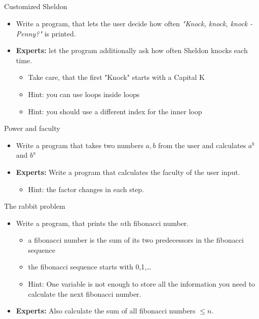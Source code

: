 \subsection{}
\begin{frame}{Customized Sheldon}
	\begin{itemize}
		\item Write a program, that lets the user decide how often \textit{"Knock, knock, knock - Penny?"} is printed.
		\item \textbf{Experts:} let the program additionally ask how often Sheldon knocks each time.
		\begin{itemize}
			\item Take care, that the first "Knock" starts with a Capital K
			\item<2-> Hint: you can use loops inside loops
			\item<3-> Hint: you should use a different index for the inner loop
		\end{itemize}
	\end{itemize}
\end{frame}
\begin{frame}{Power and faculty}
	\begin{itemize}
		\item Write a program that takes two numbers $a, b$ from the user and calculates $a^b$ and $b^a$
		\item \textbf{Experts:} Write a program that calculates the faculty of the user input.
		\begin{itemize}
			\item<2-> Hint: the factor changes in each step.
		\end{itemize}
	\end{itemize}
\end{frame}
\begin{frame}{The rabbit problem}
	\begin{itemize}
		\item Write a program, that prints the $n$th fibonacci number.
		\begin{itemize}
			\item a fibonacci number is the sum of its two predecessors in the fibonacci sequence
			\item the fibonacci sequence starts with 0,1,\dots
			\item<2-> Hint: One variable is not enough to store all the information you need to calculate the next fibonacci number.
		\end{itemize}
		\item \textbf{Experts:} Also calculate the sum of all fibonacci numbers $\leq n$.
	\end{itemize}
\end{frame}

